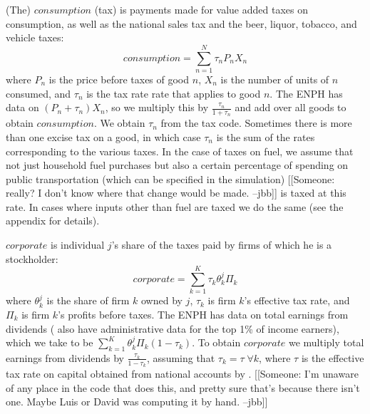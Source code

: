 \documentclass[12pt]{article}
\begin{document}
(The) $consumption$ (tax) is payments made for value added taxes on consumption,
as well as the national sales tax
and the beer, liquor, tobacco, and vehicle taxes:
\begin{equation}
consumption = \sum^{N}_{n=1} \tau_nP_nX_n
\end{equation}
where $P_n$ is the price before taxes of good $n$,
$X_n$ is the number of units of $n$ consumed,
and $\tau_n$ is the tax rate rate that applies to good $n$.
The ENPH has data on $(P_n+\tau_n)X_n$,
so we multiply this by $\frac{\tau_n}{1+\tau_n}$
and add over all goods to obtain $consumption$.
We obtain $\tau_n$ from the tax code.
Sometimes there is more than one excise tax on a good,
in which case $\tau_n$ is the sum of
the rates corresponding to the various taxes.
In the case of taxes on fuel,
we assume that not just household fuel purchases but also
a certain percentage of spending on public transportation
(which can be specified in the simulation)
[[Someone:
    really? I don't know where that change would be made.
    --jbb]]
is taxed at this rate.
In cases where inputs other than fuel are taxed we do the same
(see the appendix for details).

$corporate$ is individual $j$'s share of
the taxes paid by firms of which he is a stockholder:
\begin{equation}
corporate = \sum^{K}_{k=1} \tau_k\theta^j_k\Pi_k
\end{equation}
where $\theta^j_k$ is the share of firm $k$ owned by $j$,
$\tau_k$ is firm $k$'s effective tax rate,
and $\Pi_k$ is firm $k$'s profits before taxes.
The ENPH has data on total earnings from dividends
(\citet{juliana} also have administrative data for the top 1\% of income earners),
which we take to be $\sum^{K}_{k=1} \theta^j_k\Pi_k(1-\tau_k)$.
To obtain $corporate$ we multiply total earnings from dividends by
$\frac{\tau_k}{1-\tau_k}$,
assuming that $\tau_k=\tau \; \forall k$,
where $\tau$ is the effective tax rate on capital
obtained from national accounts by \citet{banrep}.
[[Someone:
    I'm unaware of any place in the code that does this,
    and pretty sure that's because there isn't one.
    Maybe Luis or David was computing it by hand.
    --jbb]]
\end{document}
